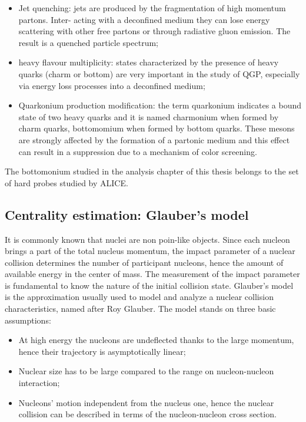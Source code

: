 \begin{itemize}
    \item Jet quenching: jets are produced by the fragmentation of high momentum partons. Inter- acting with a deconfined medium they can lose energy scattering with other free partons or through radiative gluon emission. The result is a quenched particle spectrum;
    \item heavy flavour multiplicity: states characterized by the presence of heavy quarks (charm or bottom) are very important in the study of QGP, especially via energy loss processes into a deconfined medium;
    \item Quarkonium production modification: the term quarkonium indicates a bound state of two heavy quarks and it is named charmonium when formed by charm quarks, bottomomium when formed by bottom quarks. These mesons are strongly affected by the formation of a partonic medium and this effect can result in a suppression due to a mechanism of color screening.
\end{itemize}

The bottomonium studied in the analysis chapter of this thesis belongs to the set of hard probes studied by ALICE.

\subsection{Centrality estimation: Glauber's model}\label{intro_glauber}
It is commonly known that nuclei are non poin-like objects.
Since each nucleon brings a part of the total nucleus momentum, the impact parameter of a nuclear collision determines the number of participant nucleons, hence the amount of available energy in the center of mass.
The measurement of the impact parameter is fundamental to know the nature of the initial collision state.
Glauber's model is the approximation usually used to model and analyze a nuclear collision characteristics, named after Roy Glauber.
The model stands on three basic assumptions:
\begin{itemize}
\item At high energy the nucleons are undeflected thanks to the large momentum, hence their trajectory is asymptotically linear;
\item Nuclear size has to be large compared to the range on nucleon-nucleon interaction;
\item Nucleons' motion independent from the nucleus one, hence the nuclear collision can be described in terms of the nucleon-nucleon cross section.
\end{itemize}

